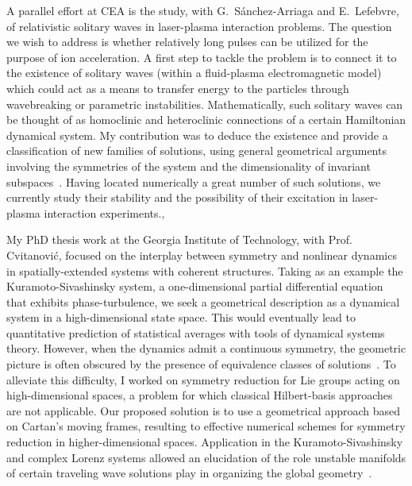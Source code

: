 \documentclass[11pt,a4paper,final]{moderncv}
\begin{document}
A parallel effort at CEA is the study, with G.~S\'anchez-Arriaga and 
E.~Lefebvre, of relativistic solitary waves in laser-plasma interaction 
problems. 
The question we wish to address is whether relatively long pulses can be utilized for
the purpose of ion acceleration. A first step to tackle the
problem is to connect it to the existence of solitary waves 
(within a fluid-plasma electromagnetic model) which could act as a means to transfer   
energy to the particles through wavebreaking or parametric instabilities. 
Mathematically, such solitary waves can be thought of as homoclinic
and heteroclinic connections of a certain Hamiltonian dynamical system.
My contribution was to deduce the existence and provide a classification of new
families of solutions, using general geometrical arguments 
involving the symmetries of the system and the dimensionality 
of invariant subspaces~\cite{SSL11}. Having located numerically a great number of such
solutions, we currently study their stability and the possibility 
of their excitation in laser-plasma interaction experiments.\sep

My PhD thesis work at the Georgia Institute of Technology, 
with Prof. Cvitanovi\'c,
focused on the interplay between symmetry and nonlinear dynamics
in spatially-extended systems with coherent structures. Taking as an example
the Kuramoto-Sivashinsky system, a one-dimensional 
partial differential equation that exhibits phase-turbulence, we seek
a geometrical description as a dynamical system in a high-dimensional 
state space. This would eventually lead to quantitative prediction of 
statistical averages with tools of dynamical systems theory. 
However, when the dynamics admit a continuous
symmetry, the geometric picture is often obscured by the presence of equivalence
classes of solutions~\cite{SCD07}. To alleviate this difficulty, I worked on symmetry
reduction for Lie groups acting on high-dimensional spaces, a problem
for which classical Hilbert-basis approaches are not applicable. Our proposed 
solution is to use a geometrical approach based on Cartan's moving frames,
resulting to effective numerical schemes for symmetry reduction 
in higher-dimensional spaces. 
Application in the Kuramoto-Sivashinsky and complex Lorenz systems 
allowed an elucidation of the role unstable manifolds of certain traveling wave 
solutions play in organizing the 
global geometry~\cite{SiCvi10,SiminosThesis}.
\end{document}
